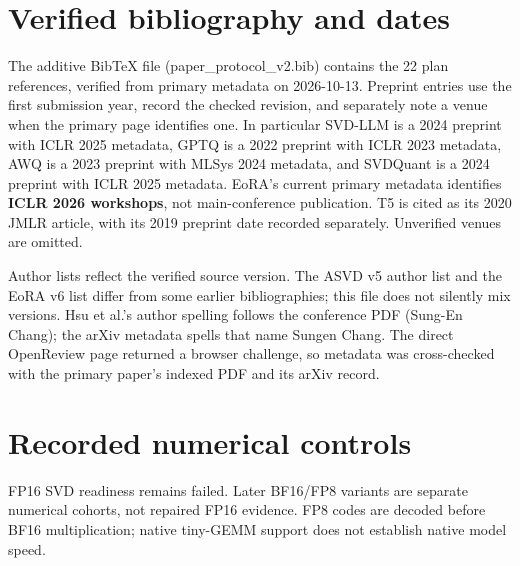 \documentclass[10pt]{article}
\begin{document}
\section{Verified bibliography and dates}

The additive BibTeX file (paper\_protocol\_v2.bib) contains the 22 plan references,
verified from primary metadata on 2026-10-13. Preprint entries use the first
submission year, record the checked revision, and separately note a venue when
the primary page identifies one. In particular SVD-LLM is a 2024 preprint with
ICLR 2025 metadata, GPTQ is a 2022 preprint with ICLR 2023 metadata, AWQ is a
2023 preprint with MLSys 2024 metadata, and SVDQuant is a 2024 preprint with ICLR
2025 metadata. EoRA's current primary metadata identifies \textbf{ICLR 2026 workshops},
not main-conference publication. T5 is cited as its 2020 JMLR article, with its
2019 preprint date recorded separately. Unverified venues are omitted.

Author lists reflect the verified source version. The ASVD v5 author list and
the EoRA v6 list differ from some earlier bibliographies; this file does not
silently mix versions. Hsu et al.'s author spelling follows the conference PDF
(Sung-En Chang); the arXiv metadata spells that name Sungen Chang. The direct
OpenReview page returned a browser challenge, so metadata was cross-checked
with the primary paper's indexed PDF and its arXiv record.

\section{Recorded numerical controls}

FP16 SVD readiness remains failed. Later BF16/FP8 variants are separate numerical cohorts, not repaired FP16 evidence. FP8 codes are decoded before BF16 multiplication; native tiny-GEMM support does not establish native model speed.
\end{document}
